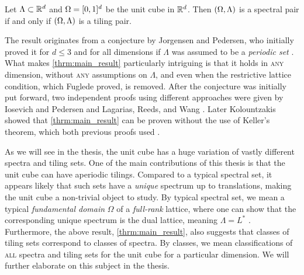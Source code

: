 \documentclass[../thesis.tex]{subfiles}
\begin{document}
\begin{theorem}\label{thrm:main_result}
    Let $\Lambda\subset \mathbb{R}^d$ and $\Omega=[0,1]^d$ be the unit cube in $\mathbb{R}^d$. Then $(\Omega,\Lambda)$ is a spectral pair if and only if $(\Omega,\Lambda)$ is a tiling pair.
\end{theorem}

The result originates from a conjecture by Jorgensen and Pedersen, who initially proved it for $d\leq3$ and for all dimensions if $\Lambda$ was assumed to be a \emph{periodic set} \cite{jorgensenSpectralPairsCartesian2001}. What makes \cref{thrm:main_result} particularly intriguing is that it holds in \textsc{any} dimension, without \textsc{any} assumptions on $\Lambda$, and even when the restrictive lattice condition, which Fuglede proved, is removed. After the conjecture was initially put forward, two independent proofs using different approaches were given by Iosevich and Pedersen \cite{iosevichSpectralTilingProperties1998} and Lagarias, Reeds, and Wang \cite{lagariasOrthonormalBasesExponentials2000}. Later Kolountzakis showed that \cref{thrm:main_result} can be proven without the use of Keller's theorem, which both previous proofs used \cite{kolountzakisPackingTilingOrthogonality2000}. 

As we will see in the thesis, the unit cube has a huge variation of vastly different spectra and tiling sets. One of the main contributions of this thesis is that the unit cube can have aperiodic tilings. Compared to a typical spectral set, it appears likely that such sets have a \emph{unique} spectrum up to translations, making the unit cube a non-trivial object to study. By typical spectral set, we mean a typical \emph{fundamental domain} $\Omega$ of a \emph{full-rank} lattice, where one can show that the corresponding unique spectrum is the dual lattice, meaning $\Lambda = L^*$ \cite{lagariasOrthonormalBasesExponentials2000}. Furthermore, the above result, \cref{thrm:main_result}, also suggests that classes of tiling sets correspond to classes of spectra. By classes, we mean classifications of \textsc{all} spectra and tiling sets for the unit cube for a particular dimension. We will further elaborate on this subject in the thesis. 
\end{document}
